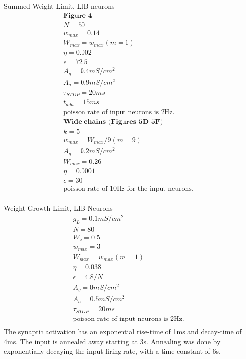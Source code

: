 \documentclass{article}
\begin{document}
\newpage

Summed-Weight Limit, LIB neurons
\begin{gather}
\textbf{Figure 4} \\
N=50 \\
w_{max}=0.14 \\
W_{max}=w_{max}(m=1) \\
\eta=0.002 \\
\epsilon = 72.5 \\
A_g=0.4 mS/cm^2 \\
A_a=0.9 mS/cm^2 \\
\tau_{STDP} = 20ms \\
t_{ada} = 15ms \\
\text{poisson rate of input neurons is 2Hz.} \\
\textbf{Wide chains (Figures 5D-5F)}\\
k=5\\
w_{max} = W_{max}/9 (m=9)\\
A_g=0.2mS/cm^2 \\
W_{max} = 0.26\\
\eta = 0.0001\\
\epsilon = 30 \\
\text{poisson rate of 10Hz for the input neurons.} \\
\end{gather}

\newpage

Weight-Growth Limit, LIB Neurons
\begin{gather}
g_L=0.1mS/cm^2\\
N=80 \\
W_o=0.5 \\
w_{max}=3 \\
W_{max}=w_{max}(m=1) \\
\eta=0.038 \\
\epsilon = 4.8/N \\
A_g=0 mS/cm^2 \\
A_a=0.5 mS/cm^2 \\
\tau_{STDP} = 20ms \\
\text{poisson rate of input neurons is 2Hz.} \\
\end{gather}
The synaptic activation has an exponential rise-time of 1ms and decay-time of 4ms. The input is annealed away starting at 3s. Annealing was done by exponentially decaying the input firing rate, with a time-constant of 6s.
\end{document}
